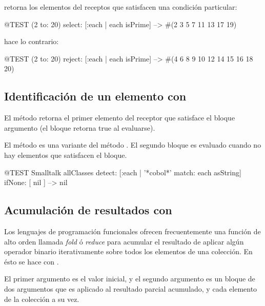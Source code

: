 \documentclass[a4paper,10pt,twoside]{book}
\begin{document}
 retorna los elementos del receptos que satisfacen una condici\'on particular:

\begin{code}{@TEST}
(2 to: 20) select: [:each | each isPrime] --> #(2 3 5 7 11 13 17 19)
\end{code}

 hace lo contrario:
\begin{code}{@TEST}
(2 to: 20) reject: [:each | each isPrime] --> #(4 6 8 9 10 12 14 15 16 18 20)
\end{code}

\subsection{Identificaci\'on de un elemento con }
El m\'etodo  retorna el primer elemento del receptor que satisface el bloque argumento (el bloque retorna true al evaluarse). 


El m\'etodo  es una variante del m\'etodo . El segundo bloque es evaluado cuando no hay elementos que satisfacen el bloque.

\begin{code}{@TEST}
Smalltalk allClasses detect: [:each | '*cobol*' match: each asString] ifNone: [ nil ] --> nil
\end{code}

\subsection{Acumulaci\'on de resultados con }
Los lenguajes de programaci\'on funcionales ofrecen frecuentemente una funci\'on de alto orden llamada \emph{fold} \'o \emph{reduce} para acumular el resultado de aplicar alg\'un operador binario iterativamente sobre todos los elementos de una colecci\'on.
En \pharo \'esto se hace con .

El primer argumento es el valor inicial, y el segundo argumento es un bloque de dos argumentos que es aplicado al resultado parcial acumulado, y cada elemento de la colecci\'on a su vez.
\end{document}

